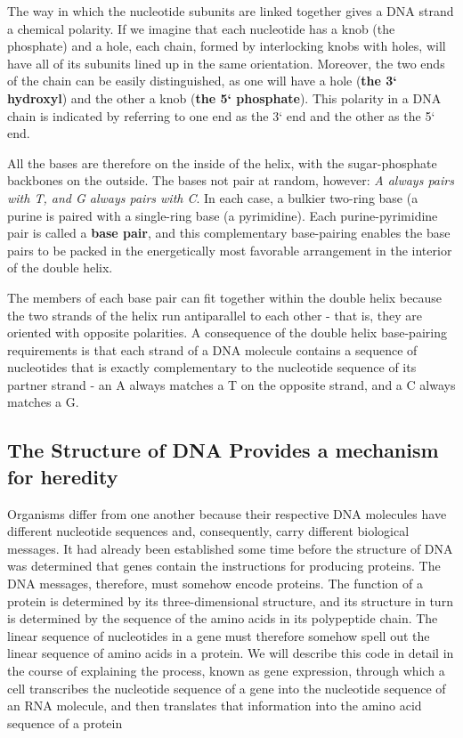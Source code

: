 The way in which the nucleotide subunits are linked together gives a
DNA strand a chemical polarity. If we imagine that each nucleotide has a
knob (the phosphate) and a hole, each chain, formed by
interlocking knobs with holes, will have all of its subunits lined up in the
same orientation. Moreover, the two ends of the chain can be easily distinguished,
as one will have a hole (\textbf{the 3` hydroxyl}) and the other a knob
(\textbf{the 5` phosphate}). This polarity in a DNA chain is indicated by referring
to one end as the 3` end and the other as the 5` end.

All the bases are therefore on the inside of the helix, with the sugar-phosphate
backbones on the outside. The bases not pair at random, however: \textit{A always pairs with T,
and G always pairs with C}. In each case, a bulkier two-ring base (a purine is paired
with a single-ring base (a pyrimidine). Each purine-pyrimidine pair is called a \textbf{base pair},
and this complementary base-pairing
enables the base pairs to be packed in the energetically most favorable
arrangement in the interior of the double helix.

The members of each base pair can fit together within the double helix because the two
strands of the helix run antiparallel to each other - that is, they are oriented
with opposite polarities.
A consequence of the double helix base-pairing requirements is that
each strand of a DNA molecule contains a sequence of nucleotides
that is exactly complementary to the nucleotide sequence of its partner
strand - an A always matches a T on the opposite strand, and a C
always matches a G.

\subsection{The Structure of DNA Provides a mechanism for heredity}

Organisms differ
from one another because their respective DNA molecules have different
nucleotide sequences and, consequently, carry different biological messages.
It had already been established some time before the structure of DNA
was determined that genes contain the instructions for producing proteins.
The DNA messages, therefore, must somehow encode proteins. The function of a protein is
determined by its three-dimensional structure, and its structure in turn is
determined by the sequence of the amino acids in its polypeptide chain.
The linear sequence of nucleotides in a gene must therefore somehow
spell out the linear sequence of amino acids in a protein.
We will describe this code in detail in the course of explaining
the process, known as gene expression, through which a cell transcribes
the nucleotide sequence of a gene into the nucleotide sequence of an
RNA molecule, and then translates that information into the amino acid
sequence of a protein

